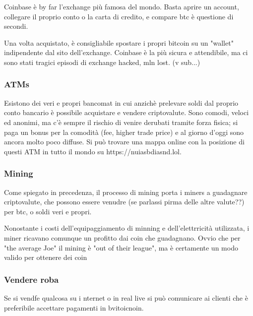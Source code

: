 \documentclass {article}
\begin{document}
Coinbase è by far l'exchange più famosa del mondo. Basta aprire un account, collegare il proprio conto o la carta di credito, e compare btc è questione di secondi.

Una volta acquistato, è consigliabile spostare i propri bitcoin su un "wallet" indipendente dal sito dell'exchange. Coinbase è la più sicura e attendibile, ma ci sono stati tragici episodi di exchange hacked, mln lost. (v sub...)



\subsubsection {ATMs}



Esistono dei veri e propri bancomat in cui anzichè prelevare soldi dal proprio conto bancario è possibile acquistare e vendere criptovalute. Sono comodi, veloci ed anonimi, ma c'è sempre il rischio di venire derubati tramite forza fisica; si paga un bonus per la comodità (fee, higher trade price) e al giorno d'oggi sono ancora molto poco diffuse. Si può trovare una mappa online con la posizione di questi ATM in tutto il mondo su https://nuiasbdiasnd.lol.



\subsubsection {Mining}



Come spiegato in precedenza, il processo di mining porta i miners a guadagnare criptovalute, che possono essere venudre (se parlassi pirma delle altre valute??) per btc, o soldi veri e propri.

Nonostante i costi dell'equipaggiamento di minning e dell'elettrricità utilizzata, i miner ricavano comunque un profitto dai coin che guadagnano. Ovvio che per "the average Joe" il mining è "out of their league", ma è certamente un modo valido per ottenere dei coin



\subsubsection {Vendere roba}



Se si vendfe qualcosa su i nternet o in real live si può comunicare ai clienti che è preferibile accettare pagamenti in bvitoicnoin.
\end{document}
